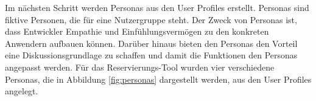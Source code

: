 		Im nächsten Schritt werden Personas aus den User Profiles erstellt. Personas sind fiktive Personen, die für eine Nutzergruppe steht. Der Zweck von Personas ist, dass Entwickler Empathie und Einfühlungsvermögen zu den konkreten Anwendern aufbauen können. Darüber hinaus bieten den Personas den Vorteil eine Diskussionsgrundlage zu schaffen und damit die Funktionen den Personas angepasst werden. Für das Reservierungs-Tool wurden vier verschiedene Personas, die in Abbildung \vref{fig:personas} dargestellt werden, aus den User Profiles angelegt. 
		
		\begin{figure}[H]

\end{figure}
